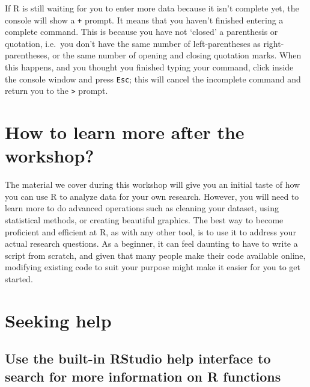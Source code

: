 \documentclass[]{book}
\begin{document}
If R is still waiting for you to enter more data because it isn't
complete yet, the console will show a \texttt{+} prompt. It means that
you haven't finished entering a complete command. This is because you
have not `closed' a parenthesis or quotation, i.e.~you don't have the
same number of left-parentheses as right-parentheses, or the same number
of opening and closing quotation marks. When this happens, and you
thought you finished typing your command, click inside the console
window and press \texttt{Esc}; this will cancel the incomplete command
and return you to the \texttt{\textgreater{}} prompt.

\section{How to learn more after the
workshop?}\label{how-to-learn-more-after-the-workshop}

The material we cover during this workshop will give you an initial
taste of how you can use R to analyze data for your own research.
However, you will need to learn more to do advanced operations such as
cleaning your dataset, using statistical methods, or creating beautiful
graphics. The best way to become proficient and efficient at R, as with
any other tool, is to use it to address your actual research questions.
As a beginner, it can feel daunting to have to write a script from
scratch, and given that many people make their code available online,
modifying existing code to suit your purpose might make it easier for
you to get started.

\section{Seeking help}\label{seeking-help}

\subsection{Use the built-in RStudio help interface to search for more
information on R
functions}\label{use-the-built-in-rstudio-help-interface-to-search-for-more-information-on-r-functions}
\end{document}
